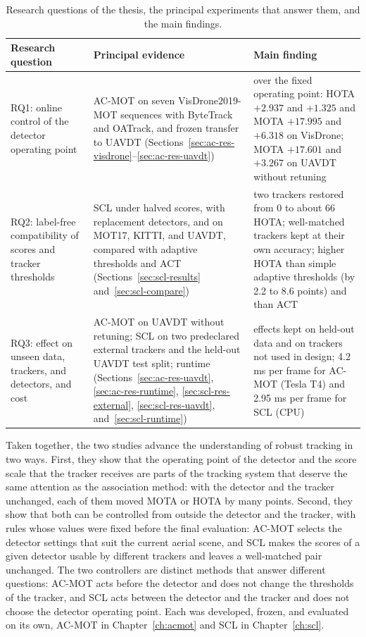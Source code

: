 \begin{table}[tbp]
\centering
\caption{Research questions of the thesis, the principal experiments that answer them, and the main findings.}
\label{tab:conc-rq}
\begin{tabular}{>{\raggedright\arraybackslash}p{2.9cm}>{\raggedright\arraybackslash}p{5.3cm}>{\raggedright\arraybackslash}p{5.7cm}}
\toprule
Research question & Principal evidence & Main finding\\
\midrule
RQ1: online control of the detector operating point & AC-MOT on seven VisDrone2019-MOT sequences with ByteTrack and OATrack, and frozen transfer to UAVDT (Sections~\ref{sec:ac-res-visdrone}--\ref{sec:ac-res-uavdt}) & over the fixed operating point: HOTA $+2.937$ and $+1.325$ and MOTA $+17.995$ and $+6.318$ on VisDrone; MOTA $+17.601$ and $+3.267$ on UAVDT without retuning\\
RQ2: label-free compatibility of scores and tracker thresholds & SCL under halved scores, with replacement detectors, and on MOT17, KITTI, and UAVDT, compared with adaptive thresholds and ACT (Sections~\ref{sec:scl-results} and~\ref{sec:scl-compare}) & two trackers restored from 0 to about 66 HOTA; well-matched trackers kept at their own accuracy; higher HOTA than simple adaptive thresholds (by 2.2 to 8.6 points) and than ACT\\
RQ3: effect on unseen data, trackers, and detectors, and cost & AC-MOT on UAVDT without retuning; SCL on two predeclared external trackers and the held-out UAVDT test split; runtime (Sections~\ref{sec:ac-res-uavdt}, \ref{sec:ac-res-runtime}, \ref{sec:scl-res-external}, \ref{sec:scl-res-uavdt}, and~\ref{sec:scl-runtime}) & effects kept on held-out data and on trackers not used in design; 4.2 ms per frame for AC-MOT (Tesla T4) and 2.95 ms per frame for SCL (CPU)\\
\bottomrule
\end{tabular}
\end{table}

Taken together, the two studies advance the understanding of robust tracking in two ways. First, they show that the operating point of the detector and the score scale that the tracker receives are parts of the tracking system that deserve the same attention as the association method: with the detector and the tracker unchanged, each of them moved MOTA or HOTA by many points. Second, they show that both can be controlled from outside the detector and the tracker, with rules whose values were fixed before the final evaluation: AC-MOT selects the detector settings that suit the current aerial scene, and SCL makes the scores of a given detector usable by different trackers and leaves a well-matched pair unchanged. The two controllers are distinct methods that answer different questions: AC-MOT acts before the detector and does not change the thresholds of the tracker, and SCL acts between the detector and the tracker and does not choose the detector operating point. Each was developed, frozen, and evaluated on its own, AC-MOT in Chapter~\ref{ch:acmot} and SCL in Chapter~\ref{ch:scl}.

